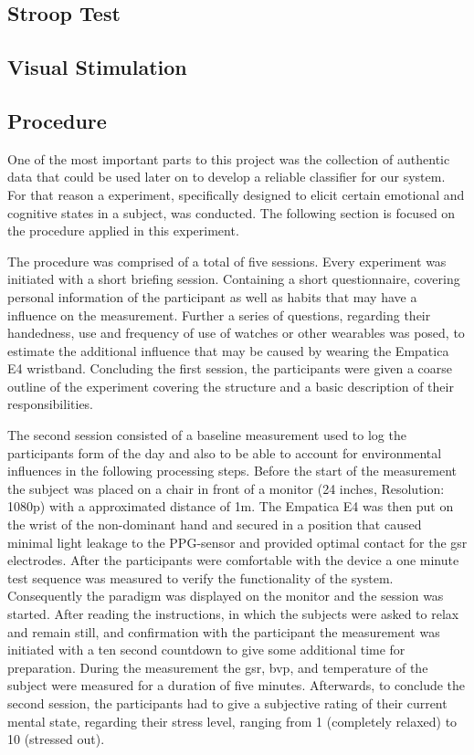 \subsection{Stroop Test}
\subsection{Visual Stimulation}
\subsection{Procedure}
One of the most important parts to this project was the collection of authentic data that could be used later on to develop a reliable classifier for our system. For that reason a experiment, specifically designed to elicit certain emotional and cognitive states in a subject, was conducted. The following section is focused on the procedure applied in this experiment.

The procedure was comprised of a total of five sessions. Every experiment was initiated with a short briefing session. Containing a short questionnaire, covering personal information of the participant as well as habits that may have a influence on the measurement. Further a series of questions, regarding their handedness, use and frequency of use of watches or other wearables was posed, to estimate the additional influence that may be caused by wearing the Empatica E4 wristband.
Concluding the first session, the participants were given a coarse outline of the experiment covering the structure and a basic description of their responsibilities.

The second session consisted of a baseline measurement used to log the participants form of the day and also to be able to account for environmental influences in the following processing steps. Before the start of the measurement the subject was placed on a chair in front of a monitor (24 inches, Resolution: 1080p) with a approximated distance of 1m. The Empatica E4 was then put on the wrist of the non-dominant hand and secured in a position that caused minimal light leakage to the PPG-sensor and provided optimal contact for the \gls{gsr} electrodes. After the participants were comfortable with the device a one minute test sequence was measured to verify the functionality of the system.
Consequently the paradigm was displayed on the monitor and the session was started. After reading the instructions, in which the subjects were asked to relax and remain still, and confirmation with the participant the measurement was initiated with a ten second countdown to give some additional time for preparation.
During the measurement the \gls{gsr}, \gls{bvp}, and temperature of the subject were measured for a duration of five minutes.
Afterwards, to conclude the second session, the participants had to give a subjective rating of their current mental state, regarding their stress level, ranging from 1 (completely relaxed) to 10 (stressed out).


